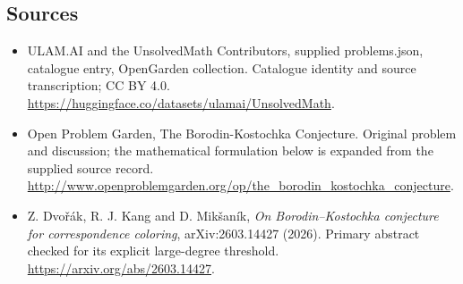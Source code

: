 \documentclass[11pt,a4paper]{article}
\begin{document}
\subsection{Sources}
\begin{itemize}
\item[S1] ULAM.AI and the UnsolvedMath Contributors, supplied problems.json, catalogue entry, OpenGarden collection. Catalogue identity and source transcription; CC BY 4.0.
\url{https://huggingface.co/datasets/ulamai/UnsolvedMath}.
\item[S2] Open Problem Garden, The Borodin-Kostochka Conjecture. Original problem and discussion; the mathematical formulation below is expanded from the supplied source record.
\url{http://www.openproblemgarden.org/op/the_borodin_kostochka_conjecture}.
\item[R1] Z. Dvořák, R. J. Kang and D. Mikšaník, \emph{On Borodin--Kostochka conjecture for correspondence coloring}, arXiv:2603.14427 (2026). Primary abstract checked for its explicit large-degree threshold.
\url{https://arxiv.org/abs/2603.14427}.
\end{itemize}
\end{document}
